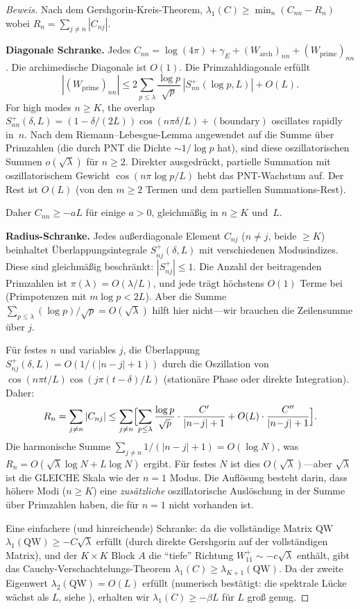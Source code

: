 \documentclass[12pt,a4paper]{article}
\theoremstyle{definition}
\theoremstyle{remark}
\begin{document}
\begin{proof}[Beweis]
Nach dem Gershgorin-Kreis-Theorem, $\lambda_1(C) \geq \min_n (C_{nn} - R_n)$ wobei $R_n = \sum_{j \neq n} |C_{nj}|$.

\textbf{Diagonale Schranke.} Jedes $C_{nn} = \log(4\pi) + \gamma_E + (W_{\mathrm{arch}})_{nn} + (W_{\mathrm{prime}})_{nn}$. Die archimedische Diagonale ist $O(1)$. Die Primzahldiagonale erfüllt
\[
  |(W_{\mathrm{prime}})_{nn}| \leq 2\sum_{p \leq \lambda}\frac{\log p}{\sqrt{p}}\,|S_{nn}^+(\log p, L)| + O(L).
\]
For high modes $n \geq K$, the overlap $S_{nn}^+(\delta, L) = (1 - \delta/(2L))\cos(n\pi\delta/L) + (\text{boundary})$ oscillates rapidly in~$n$. Nach dem Riemann--Lebesgue-Lemma angewendet auf die Summe über Primzahlen (die durch PNT die Dichte $\sim 1/\log p$ hat), sind diese oszillatorischen Summen $o(\sqrt{\lambda})$ für $n \geq 2$. Direkter ausgedrückt, partielle Summation mit oszillatorischem Gewicht $\cos(n\pi\log p / L)$ hebt das PNT-Wachstum auf. Der Rest ist $O(L)$ (von den $m \geq 2$ Termen und dem partiellen Summations-Rest).

Daher $C_{nn} \geq -aL$ für einige $a > 0$, gleichmäßig in $n \geq K$ und~$L$.

\textbf{Radius-Schranke.} Jedes außerdiagonale Element $C_{nj}$ ($n \neq j$, beide $\geq K$) beinhaltet Überlappungsintegrale $S_{nj}^+(\delta, L)$ mit verschiedenen Modusindizes. Diese sind gleichmäßig beschränkt: $|S_{nj}^+| \leq 1$. Die Anzahl der beitragenden Primzahlen ist $\pi(\lambda) = O(\lambda/L)$, und jede trägt höchstens $O(1)$ Terme bei (Primpotenzen mit $m\log p < 2L$). Aber die Summe $\sum_{p \leq \lambda} (\log p)/\sqrt{p} = O(\sqrt{\lambda})$ hilft hier nicht---wir brauchen die Zeilensumme über $j$.

Für festes $n$ und variables $j$, die Überlappung $S_{nj}^+(\delta, L) = O(1/(|n-j|+1))$ durch die Oszillation von $\cos(n\pi t/L)\cos(j\pi(t-\delta)/L)$ (stationäre Phase oder direkte Integration). Daher:
\[
  R_n = \sum_{j \neq n} |C_{nj}|
  \leq \sum_{j \neq n}\Bigl[\sum_{p \leq \lambda}\frac{\log p}{\sqrt{p}}\cdot\frac{C'}{|n\!-\!j|+1}
  + O(L)\cdot\frac{C''}{|n\!-\!j|+1}\Bigr].
\]
Die harmonische Summe $\sum_{j \neq n} 1/(|n-j|+1) = O(\log N)$, was $R_n = O(\sqrt{\lambda}\log N + L\log N)$ ergibt. Für festes $N$ ist dies $O(\sqrt{\lambda})$---aber $\sqrt{\lambda}$ ist die GLEICHE Skala wie der $n = 1$ Modus. Die Auflösung besteht darin, dass höhere Modi ($n \geq K$) eine \emph{zusätzliche} oszillatorische Auslöschung in der Summe über Primzahlen haben, die für $n = 1$ nicht vorhanden ist.

Eine einfachere (und hinreichende) Schranke: da die vollständige Matrix $\mathrm{QW}$ $\lambda_1(\mathrm{QW}) \geq -C\sqrt{\lambda}$ erfüllt (durch direkte Gershgorin auf der vollständigen Matrix), und der $K \times K$ Block $A$ die ``tiefe'' Richtung $W_{11}^+ \sim -c\sqrt{\lambda}$ enthält, gibt das Cauchy-Verschachtelungs-Theorem $\lambda_1(C) \geq \lambda_{K+1}(\mathrm{QW})$. Da der zweite Eigenwert $\lambda_2(\mathrm{QW}) = O(L)$ erfüllt (numerisch bestätigt: die spektrale Lücke wächst als $L$, siehe ), erhalten wir $\lambda_1(C) \geq -\beta L$ für $L$ groß genug.
\end{proof}
\end{document}
